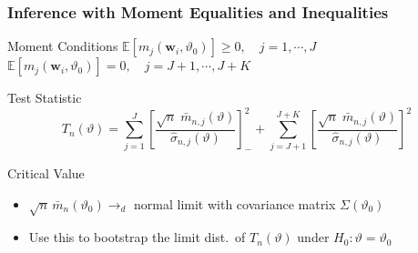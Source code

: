 \documentclass[handout]{beamer}
\begin{document}

\begin{frame}
  \frametitle{Inference with Moment Equalities and Inequalities}
  \small

\begin{block}{Moment Conditions}
  $\mathbb{E} \left[ m_j(\mathbf{w}_i,\vartheta_0) \right] \geq 0, \quad j = 1, \cdots, J$\\
  $\mathbb{E} \left[ m_j(\mathbf{w}_i,\vartheta_0) \right]  = 0, \quad j = J+1, \cdots, J + K$
\end{block}


\begin{block}{Test Statistic}
  \vspace{-1em}
\[
  T_n(\vartheta) = \sum_{j=1}^J \left[\frac{\sqrt{n}\; \bar{m}_{n,j}(\vartheta)}{\widehat{\sigma}_{n,j}(\vartheta)}\right]^2_- + \sum_{j=J+1}^{J+K} \left[\frac{\sqrt{n}\; \bar{m}_{n,j}(\vartheta)}{\widehat{\sigma}_{n,j}(\vartheta)}\right]^2
\]
\scriptsize
\end{block}

  \begin{block}{Critical Value} 
    \begin{itemize}
      \item $\sqrt{n}\, \bar{m}_n(\vartheta_0) \rightarrow_d$ normal limit with covariance matrix $\Sigma(\vartheta_0)$
    \item Use this to bootstrap the limit dist.\ of  $T_n(\vartheta)$ under $H_0\colon \vartheta = \vartheta_0$
    \end{itemize}
  \end{block}
  

\end{frame}
\end{document}
